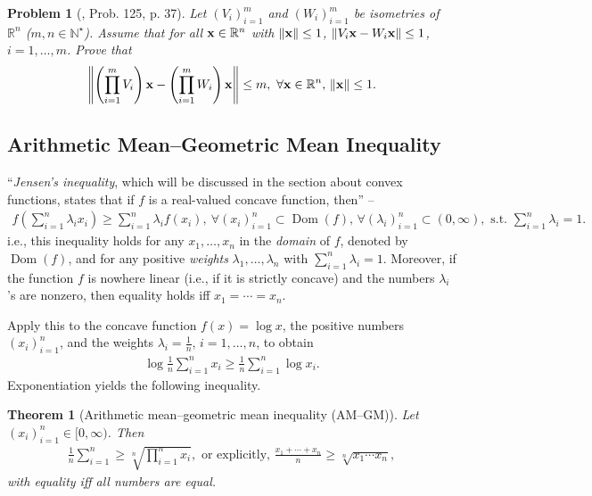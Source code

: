 \documentclass[oneside]{book}
\numberwithin{equation}{section}
\newtheorem{problem}{Problem}[section]
\newtheorem{theorem}{Theorem}[section]
\begin{document}
\begin{problem}[\cite{Gelca_Andreescu2017}, Prob. 125, p. 37]
	Let $(V_i)_{i=1}^m$ and $(W_i)_{i=1}^m$ be isometries of $\mathbb{R}^n$ ($m,n\in\mathbb{N}^\star$). Assume that for all ${\bf x}\in\mathbb{R}^n$ with $\|{\bf x}\|\le 1$, $\|V_i{\bf x} - W_i{\bf x}\|\le 1$, $i = 1,\ldots,m$. Prove that
	\begin{align*}
		\left\|\left(\prod_{i=1}^m V_i\right){\bf x} - \left(\prod_{i=1}^m W_i\right){\bf x}\right\|\le m,\ \forall{\bf x}\in\mathbb{R}^n,\,\|{\bf x}\|\le 1.
	\end{align*}
\end{problem}

\subsection{Arithmetic Mean--Geometric Mean Inequality}
``\textit{Jensen's inequality}, which will be discussed in the section about convex functions, states that if $f$ is a real-valued concave function, then'' -- \cite[Subsect. 2.1.5, p. 38]{Gelca_Andreescu2017}
\begin{align*}
	f\left(\sum_{i=1}^n \lambda_ix_i\right)\ge\sum_{i=1}^n \lambda_if(x_i),\ \forall(x_i)_{i=1}^n\subset\operatorname{Dom}(f),\,\forall(\lambda_i)_{i=1}^n\subset(0,\infty),\mbox{ s.t. }\sum_{i=1}^n \lambda_i = 1.
\end{align*}
i.e., this inequality holds for any $x_1,\ldots,x_n$ in the \textit{domain} of $f$, denoted by $\operatorname{Dom}(f)$, and for any positive \textit{weights} $\lambda_1,\ldots,\lambda_n$ with $\sum_{i=1}^n \lambda_i = 1$. Moreover, if the function $f$ is nowhere linear (i.e., if it is strictly concave) and the numbers $\lambda_i$'s are nonzero, then equality holds iff $x_1 = \cdots = x_n$.

Apply this to the concave function $f(x) = \log x$, the positive numbers $(x_i)_{i=1}^n$, and the weights $\lambda_i = \frac{1}{n}$, $i = 1,\ldots,n$, to obtain
\begin{align*}
	\log\frac{1}{n}\sum_{i=1}^n x_i\ge\frac{1}{n}\sum_{i=1}^n \log x_i.
\end{align*}
Exponentiation yields the following inequality.

\begin{theorem}[Arithmetic mean--geometric mean inequality (AM--GM)]
	Let $(x_i)_{i=1}^n\in[0,\infty)$. Then
	\begin{align*}
		\frac{1}{n}\sum_{i=1}^n\ge\sqrt[n]{\prod_{i=1}^n x_i},\mbox{ or explicitly, }\frac{x_1 + \cdots + x_n}{n}\ge\sqrt[n]{x_1\cdots x_n},
	\end{align*}
	with equality iff all numbers are equal.
\end{theorem}
\end{document}
